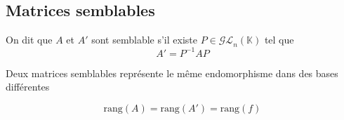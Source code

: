 \documentclass[11pt,colorlinks]{book}
\theoremstyle{mytheoremstyle}
\theoremstyle{mytheoremstyle}
\theoremstyle{mytheoremstyle}
\theoremstyle{mytheoremstyle}
\theoremstyle{mytheoremstyle}
\theoremstyle{mytheoremstyle}
\theoremstyle{mytheoremstyle}
\theoremstyle{mytheoremstyle}
\theoremstyle{myproblemstyle}
\def\mbb#1{\mathbb{#1}}
\def\mfc#1{\mathcal{#1}}
\def\bK{\mbb{K}}
\begin{document}
\subsection{Matrices semblables}
\begin{definition}
  On dit que $A$ et $A'$ sont semblable s'il existe $P \in \mfc{GL}_n(\bK)$ tel que 
  \begin{equation*}
    A' = P^{-1} A P
  \end{equation*}
\end{definition}
\begin{rmq}
  Deux matrices semblables représente le même endomorphisme dans des bases différentes
\end{rmq}
\begin{rmq}
  \begin{equation*}
    \text{rang}(A) = \text{rang}(A') = \text{rang}(f)
  \end{equation*}
\end{rmq}
\end{document}
